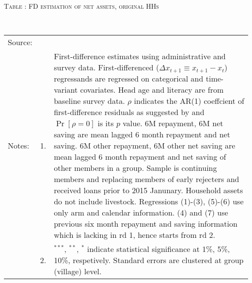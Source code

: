 \hspace{-1cm}\begin{minipage}[t]{14cm}
\hfil\textsc{\normalsize Table \thetable: FD estimation of net assets, original HHs\label{tab FD net assets original HHs}}\\
\setlength{\tabcolsep}{1pt}
\setlength{\baselineskip}{8pt}
\renewcommand{\arraystretch}{.55}
\hfil{}\\
\renewcommand{\arraystretch}{.8}
\setlength{\tabcolsep}{1pt}
\begin{tabular}{>{\hfill\scriptsize}p{1cm}<{}>{\hfill\scriptsize}p{.25cm}<{}>{\scriptsize}p{12cm}<{\hfill}}
Source:& \multicolumn{2}{l}{\scriptsize Estimated with GUK administrative and survey data.}\\
Notes: & 1. & First-difference estimates using administrative and survey data. First-differenced ($\Delta x_{t+1}\equiv x_{t+1} - x_{t}$) regressands are regressed on categorical and time-variant covariates. Head age and literacy are from baseline survey data. $\rho$ indicates the AR(1) coeffcient of first-difference residuals as suggested by \citet[][10.71]{Wooldridge2010} and $\Pr[\rho=0]$ is its $p$ value. \textsf{6M repayment, 6M net saving} are mean lagged 6 month repayment and net saving. \textsf{6M other repayment, 6M other net saving} are mean lagged 6 month repayment and net saving of other members in a group. Sample is continuing members and replacing members of early rejecters and received loans prior to 2015 Janunary. Household assets do not include livestock. Regressions (1)-(3), (5)-(6) use only arm and calendar information. (4) and (7) use previous six month repayment and saving information which is lacking in rd 1, hence starts from rd 2.\\
& 2. & ${}^{***}$, ${}^{**}$, ${}^{*}$ indicate statistical significance at 1\%, 5\%, 10\%, respetively. Standard errors are clustered at group (village) level.
\end{tabular}
\end{minipage}

